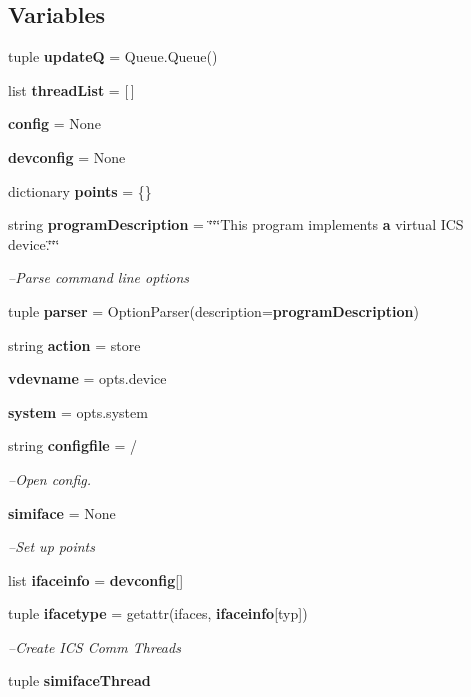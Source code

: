 \subsection*{Variables}
\begin{DoxyCompactItemize}
\item 
tuple {\bf update\+Q} = Queue.\+Queue()
\item 
list {\bf thread\+List} = [$\,$]
\item 
{\bf config} = None
\item 
{\bf devconfig} = None
\item 
dictionary {\bf points} = \{\}
\item 
string {\bf program\+Description} = \char`\"{}\char`\"{}\char`\"{}This program implements {\bf a} virtual I\+C\+S device.\char`\"{}\char`\"{}\char`\"{}
\begin{DoxyCompactList}\small\item\em --Parse command line options \end{DoxyCompactList}\item 
tuple {\bf parser} = Option\+Parser(description={\bf program\+Description})
\item 
string {\bf action} = \textquotesingle{}store\textquotesingle{}
\item 
{\bf vdevname} = opts.\+device
\item 
{\bf system} = opts.\+system
\item 
string {\bf configfile} = \textquotesingle{}/\textquotesingle{}
\begin{DoxyCompactList}\small\item\em --Open config. \end{DoxyCompactList}\item 
{\bf simiface} = None
\begin{DoxyCompactList}\small\item\em --Set up points \end{DoxyCompactList}\item 
list {\bf ifaceinfo} = {\bf devconfig}[\textquotesingle{}]
\item 
tuple {\bf ifacetype} = getattr(ifaces, {\bf ifaceinfo}[\textquotesingle{}typ\textquotesingle{}])
\begin{DoxyCompactList}\small\item\em --Create I\+C\+S Comm Threads \end{DoxyCompactList}\item 
tuple {\bf simiface\+Thread}
\item 

\end{DoxyCompactItemize}

